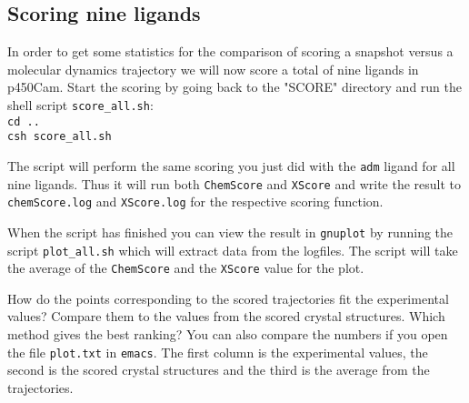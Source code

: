 \documentclass[a4paper,12pt]{article}
\newcommand{\subsctn}[1]{\subsection{#1}}
\newcommand{\chemscore} {\texttt{ChemScore}}
\newcommand{\xscore} {\texttt{X\-Score}}
\begin{document}
\subsctn {Scoring nine ligands}

In order to get some statistics for the comparison of scoring a
snapshot versus a molecular dynamics trajectory we will now score
a total of nine ligands in p450Cam. Start the scoring by going
back to the "SCORE" directory and run the shell script
\texttt{score\_all.sh}:\\
\texttt{cd ..} \\
\texttt{csh score\_all.sh}

\noindent The script will perform the same scoring you just did
with the \texttt{adm} ligand for all nine ligands. Thus it will
run both {\chemscore} and {\xscore} and write the result to
\texttt{chemScore.log} and  \texttt{XScore.log} for the respective
scoring function.

\noindent When the script has finished you can view the result in
\texttt{gnuplot} by running the script \texttt{plot\_all.sh} which
will extract data from the logfiles. The script will take the
average of the {\chemscore} and the {\xscore} value for the plot.

\noindent How do the points corresponding to the scored
trajectories fit the experimental values? Compare them to the
values from the scored crystal structures. Which method gives the
best ranking? You can also compare the numbers if you open the
file \texttt{plot.txt} in \texttt{emacs}. The first column is the
experimental values, the second is the scored crystal structures
and the third is the average from the trajectories.




\end{document}

